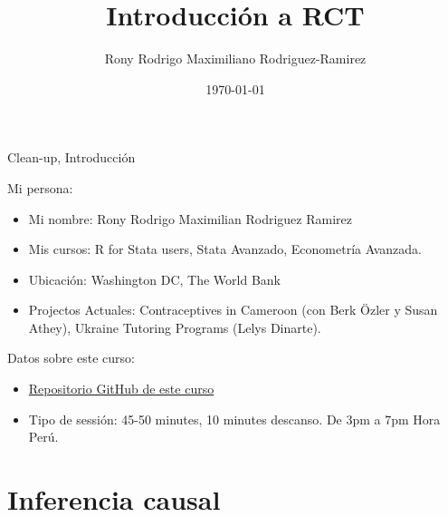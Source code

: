 \documentclass[11pt, aspectratio=169, compress]{beamer}
\title{Introducción a RCT}
\author{Rony Rodrigo Maximiliano Rodriguez-Ramirez}
\institute{maximiliano.rod.ra@gmail.com \\ DECRG | The World Bank}
\date{\today}
\begin{document}
	
\begin{frame}[plain]
	\maketitle  
\end{frame}


\begin{frame}[t]{Clean-up, Introducción}

Mi persona:
\begin{itemize}
  \item Mi nombre: Rony Rodrigo Maximilian Rodriguez Ramirez
  \item Mis cursos: R for Stata users, Stata Avanzado, Econometría Avanzada.
  \item Ubicación: Washington DC, The World Bank
  \item Projectos Actuales: Contraceptives in Cameroon (con Berk Özler y Susan Athey), Ukraine Tutoring Programs (Lelys Dinarte).
\end{itemize}

Datos sobre este curso:
\begin{itemize}
  \item \href{https://github.com/lambda-stata/econometria-avanzada}{Repositorio GitHub de este curso} \, \faGithub 
  \item Tipo de sessión: 45-50 minutes, 10 minutes descanso. De 3pm a 7pm Hora Perú.
\end{itemize}

\end{frame}

\section{Inferencia causal}
\end{document}
